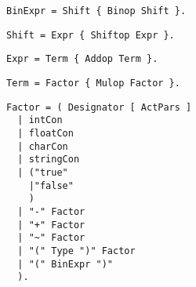 
\begin{samepage}
\begin{lstlisting}[language=EBNF]
BinExpr = Shift { Binop Shift }.
\end{lstlisting}
\end{samepage}


\begin{samepage}
\begin{lstlisting}[language=EBNF]
Shift = Expr { Shiftop Expr }.
\end{lstlisting}
\end{samepage}


\begin{samepage}
\begin{lstlisting}[language=EBNF]
Expr = Term { Addop Term }.
\end{lstlisting}
\end{samepage}




\begin{samepage}
\begin{lstlisting}[language=EBNF]
Term = Factor { Mulop Factor }.
\end{lstlisting}
\end{samepage}


\begin{samepage}
\begin{lstlisting}[language=EBNF]
Factor = ( Designator [ ActPars ]
  | intCon
  | floatCon
  | charCon
  | stringCon
  | ("true"
    |"false"
    )
  | "-" Factor
  | "+" Factor
  | "~" Factor
  | "(" Type ")" Factor
  | "(" BinExpr ")"
  ).
\end{lstlisting}
\end{samepage}

